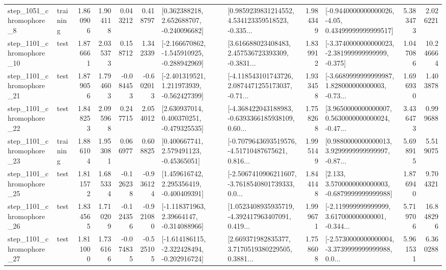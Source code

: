 \begin{tabular}{llrrrrllrlrr}
  step\_1051\_chromophore\_8 &  training &      1.860906 &    1.904118 &      0.043212 &  0.418797 &    [0.362388218, 2.652688707, -0.240096682] &  [0.9859239831214552, 4.534123359518523, -0.335... &       1.984349 &  [-0.9440000000000026, -4.05, 0.43499999999999517] &            5.383473 &          2.026221 \\
 step\_1101\_chromophore\_10 &      test &      1.876661 &    2.035373 &      0.158712 &  1.342339 &  [-2.166670862, -1.545910925, -0.288942969] &  [3.616688023408483, 2.457536723393309, -0.3831... &       1.839912 &  [-3.3740000000000023, -2.381999999999999, -0.375] &            1.047086 &         10.246664 \\
 step\_1101\_chromophore\_21 &      test &      1.879056 &    1.794603 &     -0.084453 & -0.602013 &   [-2.401319521, 1.211973939, -0.562427399] &  [-4.118543101743726, 2.0874471255173037, -0.71... &       1.933458 &  [-3.6689999999999987, 1.828000000000003, -0.73... &            1.696930 &          1.403878 \\
 step\_1101\_chromophore\_22 &      test &      1.848253 &    2.095968 &      0.247715 &  2.054012 &    [2.630937014, 0.400370251, -0.479325535] &  [-4.368422043188983, -0.6393366185938109, 0.60... &       1.758268 &  [3.9650000000000007, 0.5630000000000024, -0.47... &            3.436473 &          0.999688 \\
 step\_1101\_chromophore\_23 &  training &      1.886104 &    1.953081 &      0.066977 &  0.608825 &     [0.400667741, 2.579491123, -0.45365051] &  [-0.7079643693519576, -4.51710487675621, 0.816... &       1.995149 &  [0.9880000000000013, 3.9299999999999997, -0.87... &            5.698915 &          5.519075 \\
 step\_1101\_chromophore\_25 &      test &      1.811572 &    1.685334 &     -0.126238 & -0.936124 &    [1.459616742, 2.295356419, -0.400409391] &  [-2.5067410906211607, -3.7618540801739333, 0.0... &       1.844148 &   [2.133, 3.5700000000000003, -0.6879999999999988] &            1.876940 &          9.704321 \\
 step\_1101\_chromophore\_26 &      test &      1.834565 &    1.710209 &     -0.124356 & -0.921080 &    [-1.118371963, 2.39664147, -0.314088966] &  [1.0523408935935719, -4.392417963407091, 0.419... &       1.999671 &  [-2.119999999999999, 3.617000000000001, -0.344... &            5.719706 &         16.848296 \\
 step\_1101\_chromophore\_27 &      test &      1.811000 &    1.736166 &     -0.074835 & -0.525105 &  [-1.614186115, -2.322428494, -0.202916724] &  [2.669371982835377, 3.7170519380229505, 0.3881... &       1.758608 &  [-2.5730000000000004, -3.3739999999999988, 0.0... &            5.961531 &          6.360288 \\

\end{tabular}
